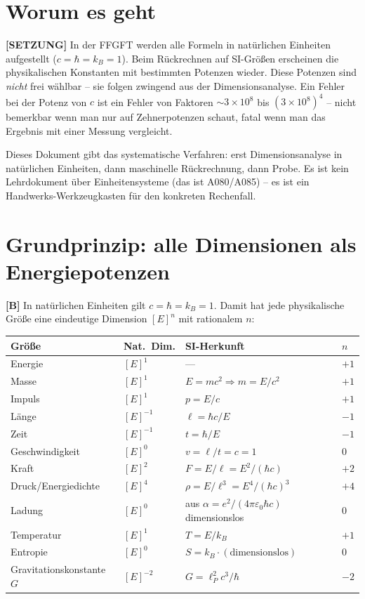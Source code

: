 \section{Worum es geht}

\textbf{[SETZUNG]} In der FFGFT werden alle Formeln in natürlichen Einheiten
aufgestellt ($c=\hbar=k_B=1$). Beim Rückrechnen auf SI-Größen erscheinen die
physikalischen Konstanten mit bestimmten Potenzen wieder. Diese Potenzen sind
\emph{nicht} frei wählbar -- sie folgen zwingend aus der Dimensionsanalyse.
Ein Fehler bei der Potenz von $c$ ist ein Fehler von Faktoren
$\sim3\times10^8$ bis $(3\times10^8)^4$ -- nicht bemerkbar wenn man nur auf
Zehnerpotenzen schaut, fatal wenn man das Ergebnis mit einer Messung vergleicht.

Dieses Dokument gibt das systematische Verfahren: erst Dimensionsanalyse in
natürlichen Einheiten, dann maschinelle Rückrechnung, dann Probe. Es ist kein
Lehrdokument über Einheitensysteme (das ist A080/A085) -- es ist ein
Handwerks-Werkzeugkasten für den konkreten Rechenfall.

\section{Grundprinzip: alle Dimensionen als Energiepotenzen}

\textbf{[B]} In natürlichen Einheiten gilt $c=\hbar=k_B=1$. Damit hat jede
physikalische Größe eine eindeutige Dimension $[E]^n$ mit rationalem $n$:

\begin{center}
\renewcommand{\arraystretch}{1.35}
{\small
\begin{tabular}{llll}
\toprule
Größe & Nat.~Dim. & SI-Herkunft & $n$ \\
\midrule
Energie & $[E]^1$ & --- & $+1$ \\
Masse & $[E]^1$ & $E=mc^2\Rightarrow m=E/c^2$ & $+1$ \\
Impuls & $[E]^1$ & $p=E/c$ & $+1$ \\
Länge & $[E]^{-1}$ & $\ell=\hbar c/E$ & $-1$ \\
Zeit & $[E]^{-1}$ & $t=\hbar/E$ & $-1$ \\
Geschwindigkeit & $[E]^0$ & $v=\ell/t=c=1$ & $0$ \\
Kraft & $[E]^2$ & $F=E/\ell=E^2/(\hbar c)$ & $+2$ \\
Druck/Energiedichte & $[E]^4$ & $\rho=E/\ell^3=E^4/(\hbar c)^3$ & $+4$ \\
Ladung & $[E]^0$ & aus $\alpha=e^2/(4\pi\varepsilon_0\hbar c)$ dimensionslos & $0$ \\
Temperatur & $[E]^1$ & $T=E/k_B$ & $+1$ \\
Entropie & $[E]^0$ & $S=k_B\cdot(\text{dimensionslos})$ & $0$ \\
Gravitationskonstante $G$ & $[E]^{-2}$ & $G=\ell_P^2c^3/\hbar$ & $-2$ \\
\bottomrule
\end{tabular}
}
\renewcommand{\arraystretch}{1.0}
\end{center}

